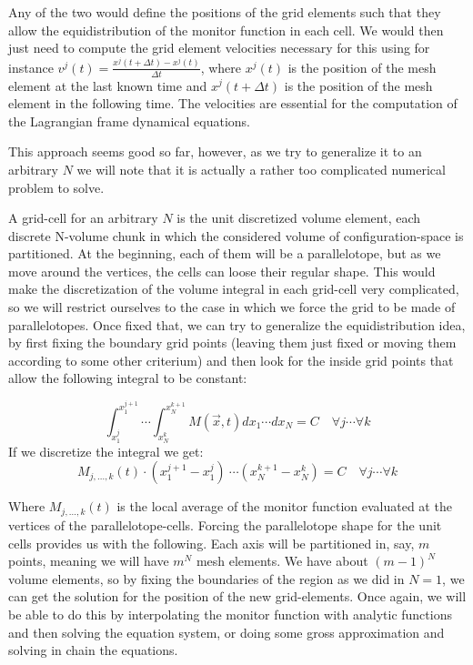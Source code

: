 \documentclass[11pt, a4paper]{article} %
\begin{document}
Any of the two would define the positions of the grid elements such that they allow the equidistribution of the monitor function in each cell. We would then just need to compute the grid element velocities necessary for this using for instance $v^j(t)=\frac{x^j(t+\Delta t)-x^j(t)}{\Delta t}$, where $x^j(t)$ is the position of the mesh element at the last known time and $x^j(t+\Delta t)$ is the position of the mesh element in the following time. The velocities are essential for the computation of the Lagrangian frame dynamical equations.

This approach seems good so far, however, as we try to generalize it to an arbitrary $N$ we will note that it is actually a rather too complicated numerical problem to solve.

A grid-cell for an arbitrary $N$ is the unit discretized volume element, each discrete N-volume chunk in which the considered volume of configuration-space is partitioned. At the beginning, each of them will be a parallelotope, but as we move around the vertices, the cells can loose their regular shape. This would make the discretization of the volume integral in each grid-cell very complicated, so we will restrict ourselves to the case in which we force the grid to be made of parallelotopes. Once fixed that, we can try to generalize the equidistribution idea, by first fixing the boundary grid points (leaving them just fixed or moving them according to some other criterium) and then look for the inside grid points that allow the following integral to be constant:

\begin{equation}
\int_{x_1^j}^{x_1^{j+1}}\cdots \int_{x_N^k}^{x_N^{k+1}} M(\vec{x},t) dx_1 \cdots dx_N=C \quad \forall j\cdots \forall k
\end{equation}
If we discretize the integral we get:
\begin{equation}\label{monitor}
 M_{j,...,k}(t)\cdot (x_1^{j+1}-x_1^j)\ \cdots (x_N^{k+1}-x_N^k) =C \quad \forall j\cdots \forall k
\end{equation}

Where $M_{j,...,k}(t)$ is the local average of the monitor function evaluated at the vertices of the parallelotope-cells. Forcing the parallelotope shape for the unit cells provides us with the following. Each axis will be partitioned in, say, $m$ points, meaning we will have $m^N$ mesh elements. We have about $(m-1)^N$ volume elements, so by fixing the boundaries of the region as we did in $N=1$, we can get the solution for the position of the new grid-elements. Once again, we will be able to do this by interpolating the monitor function with analytic functions and then solving the equation system, or doing some gross approximation and solving in chain the equations.
\end{document}
